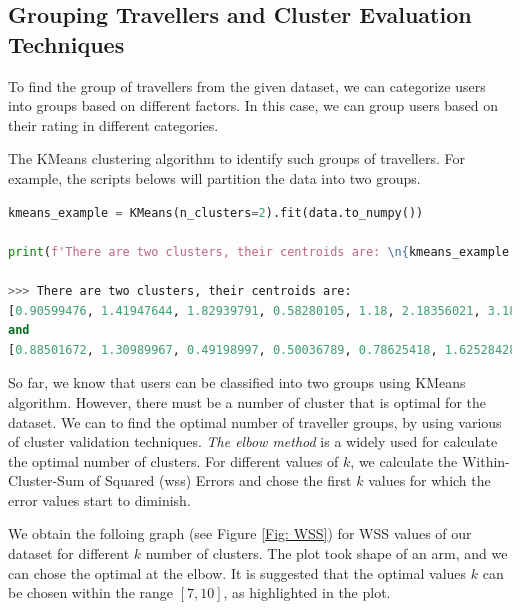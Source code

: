 \subsection{Grouping Travellers and Cluster Evaluation Techniques}
To find the group of travellers from the given dataset, we can categorize users into groups based on different factors.
In this case, we can group users based on their rating in different categories.

The KMeans clustering algorithm to identify such groups of travellers.
For example, the scripts belows will partition the data into two groups.

\begin{lstlisting}[language=Python]
kmeans_example = KMeans(n_clusters=2).fit(data.to_numpy())

print(f'There are two clusters, their centroids are: \n{kmeans_example.cluster_centers_[0]} \nand \n{kmeans_example.cluster_centers_[1]}')

>>> There are two clusters, their centroids are: 
[0.90599476, 1.41947644, 1.82939791, 0.58280105, 1.18, 2.18356021, 3.1871466,  2.80489529, 1.52609948, 2.60157068] 
and 
[0.88501672, 1.30989967, 0.49198997, 0.50036789, 0.78625418, 1.62528428, 3.17697324, 2.8543311, 1.59712375, 2.92548495]
\end{lstlisting}

So far, we know that users can be classified into two groups using KMeans algorithm.
However, there must be a number of cluster that is optimal for the dataset.
We can to find the optimal number of traveller groups, by using various of cluster validation techniques.
\emph{The elbow method} \cite{syakur2018integration} is a widely used for calculate the optimal number of clusters.
For different values of $k$, we calculate the Within-Cluster-Sum of Squared (wss) Errors and chose the first $k$ values for which the error values start to diminish.

We obtain the folloing graph (see Figure \ref{Fig: WSS}) for WSS values of our dataset for different $k$ number of clusters.
The plot took shape of an arm, and we can chose the optimal at the elbow.
It is suggested that the optimal values $k$ can be chosen within the range $[7, 10]$, as highlighted in the plot.

